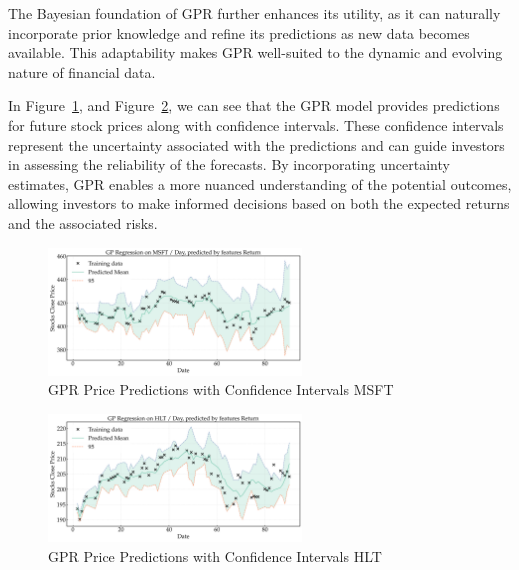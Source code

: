 The Bayesian foundation of GPR further enhances its utility, as it can naturally incorporate prior knowledge and refine its predictions as new data becomes available. This adaptability makes GPR well-suited to the dynamic and evolving nature of financial data.

In Figure~\ref{fig:gpr_predictions_MSFT_price}, and Figure~\ref{fig:gpr_predictions_HLT_price}, we can see that the GPR model provides predictions for future stock prices along with confidence intervals. 
These confidence intervals represent the uncertainty associated with the predictions and can guide investors in assessing the reliability of the forecasts. By incorporating uncertainty estimates, GPR enables a more nuanced understanding of the potential outcomes, allowing investors to make informed decisions based on both the expected returns and the associated risks.

\begin{figure}[h]
    \centering
    \includegraphics[width=0.6\textwidth]{figures/future_predictions_MSFT.png}
    \caption{GPR Price Predictions with Confidence Intervals MSFT}
    \label{fig:gpr_predictions_MSFT_price}
\end{figure}

\begin{figure}[h]
    \centering
    \includegraphics[width=0.6\textwidth]{figures/future_predictions_HLT.png}
    \caption{GPR Price Predictions with Confidence Intervals HLT}
    \label{fig:gpr_predictions_HLT_price}
\end{figure}

